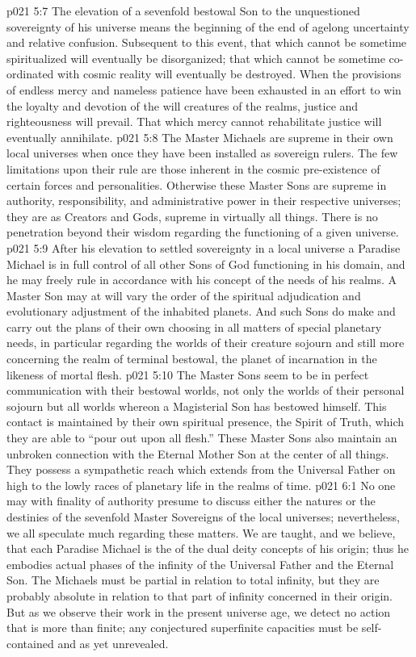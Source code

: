 \vs p021 5:7 The elevation of a sevenfold bestowal Son to the unquestioned sovereignty of his universe means the beginning of the end of agelong uncertainty and relative confusion. Subsequent to this event, that which cannot be sometime spiritualized will eventually be disorganized; that which cannot be sometime co\hyp{}ordinated with cosmic reality will eventually be destroyed. When the provisions of endless mercy and nameless patience have been exhausted in an effort to win the loyalty and devotion of the will creatures of the realms, justice and righteousness will prevail. That which mercy cannot rehabilitate justice will eventually annihilate.
\pc \vs p021 5:8 The Master Michaels are supreme in their own local universes when once they have been installed as sovereign rulers. The few limitations upon their rule are those inherent in the cosmic pre\hyp{}existence of certain forces and personalities. Otherwise these Master Sons are supreme in authority, responsibility, and administrative power in their respective universes; they are as Creators and Gods, supreme in virtually all things. There is no penetration beyond their wisdom regarding the functioning of a given universe.
\vs p021 5:9 After his elevation to settled sovereignty in a local universe a Paradise Michael is in full control of all other Sons of God functioning in his domain, and he may freely rule in accordance with his concept of the needs of his realms. A Master Son may at will vary the order of the spiritual adjudication and evolutionary adjustment of the inhabited planets. And such Sons do make and carry out the plans of their own choosing in all matters of special planetary needs, in particular regarding the worlds of their creature sojourn and still more concerning the realm of terminal bestowal, the planet of incarnation in the likeness of mortal flesh.
\vs p021 5:10 The Master Sons seem to be in perfect communication with their bestowal worlds, not only the worlds of their personal sojourn but all worlds whereon a Magisterial Son has bestowed himself. This contact is maintained by their own spiritual presence, the Spirit of Truth, which they are able to “pour out upon all flesh.” These Master Sons also maintain an unbroken connection with the Eternal Mother Son at the center of all things. They possess a sympathetic reach which extends from the Universal Father on high to the lowly races of planetary life in the realms of time.
\vs p021 6:1 No one may with finality of authority presume to discuss either the natures or the destinies of the sevenfold Master Sovereigns of the local universes; nevertheless, we all speculate much regarding these matters. We are taught, and we believe, that each Paradise Michael is the  of the dual deity concepts of his origin; thus he embodies actual phases of the infinity of the Universal Father and the Eternal Son. The Michaels must be partial in relation to total infinity, but they are probably absolute in relation to that part of infinity concerned in their origin. But as we observe their work in the present universe age, we detect no action that is more than finite; any conjectured superfinite capacities must be self\hyp{}contained and as yet unrevealed.

